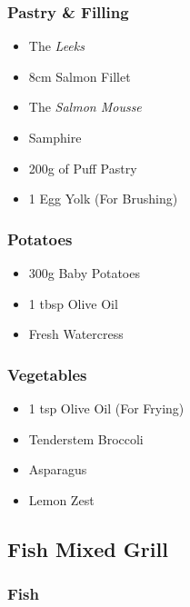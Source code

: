 \documentclass[11pt, english]{article}
\begin{document}
		\subsubsection*{Pastry \& Filling}

	\begin{itemize}
        \setlength\itemsep{0cm}
		\item The \textit{Leeks}
		\item 8cm Salmon Fillet
		\item The \textit{Salmon Mousse}
		\item Samphire
		\item 200g of Puff Pastry
		\item 1 Egg Yolk (For Brushing)
        \end{itemize}

		\subsubsection*{Potatoes}

	\begin{itemize}
        \setlength\itemsep{0cm}
		\item 300g Baby Potatoes
		\item 1 tbsp Olive Oil
		\item Fresh Watercress
        \end{itemize}

		\subsubsection*{Vegetables}

	\begin{itemize}
        \setlength\itemsep{0cm}
		\item 1 tsp Olive Oil (For Frying)
		\item Tenderstem Broccoli
		\item Asparagus
		\item Lemon Zest
        \end{itemize}

\newpage

	\subsection{Fish Mixed Grill}

		\subsubsection*{Fish}
\end{document}

